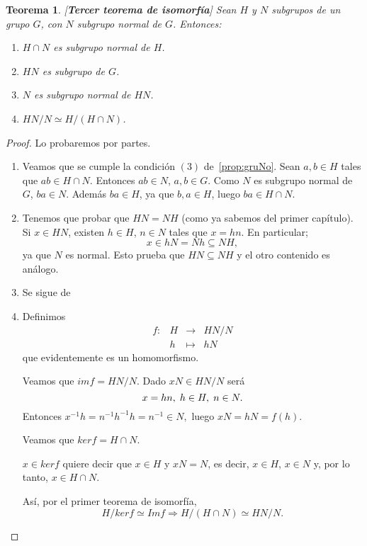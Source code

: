 \documentclass[12pt]{article}
\newtheorem{theorem}{Teorema}[section]
\begin{document}
\begin{theorem}\label{ex:terIso} [\textbf{\textit{Tercer teorema de isomorfía}}]
Sean $H$ y $N$ subgrupos de un grupo $G$, con $N$ subgrupo normal de $G$. Entonces:
\begin{enumerate}
\item $H \cap N$ es subgrupo normal de $H$.
\item $HN$ es subgrupo de $G$.
\item $N$ es subgrupo normal de $HN$.
\item $HN/N \simeq H/(H \cap N)$.
\end{enumerate}
\end{theorem}
\begin{proof}
Lo probaremos por partes.
\begin{enumerate}
\item  Veamos que se cumple la condición $(3)$ de~\ref{prop:gruNo}. Sean $a,b \in H$ tales que $ab \in H \cap N$. Entonces $ab \in N$, $a,b \in G$. Como $N$ es subgrupo normal de $G$, $ba \in N$. Además $ba \in H$, ya que $b, a \in H$, luego $ba \in H \cap N$.
\item Tenemos que probar que $HN = NH$ (como ya sabemos del primer capítulo). Si $x \in HN$, existen $h \in H$, $n \in N$ tales que $x = hn$. En particular; $$x \in hN = Nh \subseteq NH,$$ ya que $N$ es normal. Esto prueba que $HN \subseteq NH$ y el otro contenido es análogo.
\item Se sigue de~
\item  Definimos $$\begin{array}{rccl}
f\colon &H & \longrightarrow & HN/N\\
&h& \longmapsto &hN
\end{array}
$$ que evidentemente es un homomorfismo.

Veamos que $im f = HN/N$. Dado $xN \in HN/N$ será $$x = hn, \hspace{0.1cm} h \in H, \hspace{0.1cm} n \in N.$$Entonces $x^{-1}h = n^{-1}h^{-1}h = n^{-1} \in N,$ luego $xN = hN = f(h).$

Veamos que $ker f = H \cap N$.
\begin{center}
$x \in ker f$ quiere decir que $x \in H$ y $xN = N$, es decir, $x \in H$, $x \in N$ y, por lo tanto, $x \in H \cap N$.
\end{center}
Así, por el primer teorema de isomorfía, $$H/ker f \simeq Im f \Longrightarrow H/(H \cap N) \simeq HN/N.$$
\end{enumerate}

\end{proof}
\end{document}
